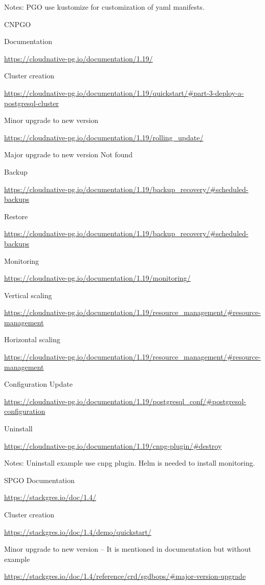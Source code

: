 Notes: PGO use kustomize for customization of yaml manifests.

CNPGO

Documentation

\url{https://cloudnative-pg.io/documentation/1.19/}

Cluster creation

\url{https://cloudnative-pg.io/documentation/1.19/quickstart/#part-3-deploy-a-postgresql-cluster}

Minor upgrade to new version

\url{https://cloudnative-pg.io/documentation/1.19/rolling_update/}

Major upgrade to new version
Not found

Backup

\url{https://cloudnative-pg.io/documentation/1.19/backup_recovery/#scheduled-backups}

Restore

\url{https://cloudnative-pg.io/documentation/1.19/backup_recovery/#scheduled-backups}

Monitoring

\url{https://cloudnative-pg.io/documentation/1.19/monitoring/}

Vertical scaling

\url{https://cloudnative-pg.io/documentation/1.19/resource_management/#resource-management}

Horizontal scaling

\url{https://cloudnative-pg.io/documentation/1.19/resource_management/#resource-management}

Configuration Update

\url{https://cloudnative-pg.io/documentation/1.19/postgresql_conf/#postgresql-configuration}

Uninstall

\url{https://cloudnative-pg.io/documentation/1.19/cnpg-plugin/#destroy}

Notes: Uninstall example use cnpg plugin. Helm is needed to install monitoring.

SPGO
Documentation

\url{https://stackgres.io/doc/1.4/}

Cluster creation

\url{https://stackgres.io/doc/1.4/demo/quickstart/}

Minor upgrade to new version – It is mentioned in documentation but without example

\url{https://stackgres.io/doc/1.4/reference/crd/sgdbops/#major-version-upgrade}

